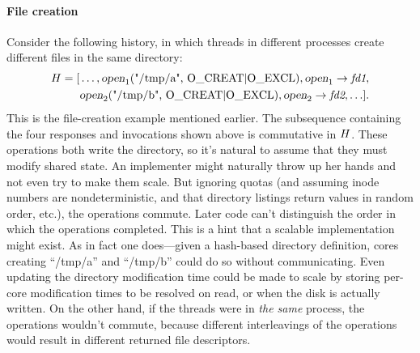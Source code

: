\begin{comment}
Careful analysis using our commutativity definition reveals that
increments and decrements commute as long as the counter is large
enough. If the counter is small, however, decrements may not commute.
For example, if the counter is one, and there are two concurrent
decrements, which one returns true and which false depends on
the order. Thus this interface does not allow a generally commutative
implementation.

However, the commutativity analysis suggests a way to change the
interface so that it can scale. In particular:
\begin{verbatim}
  inc() -> void
  dec() -> void
  nonzero?() -> boolean
\end{verbatim}
Now increments and decrements scale. If the calls to \OP{nonzero?}
can be moved to a background thread that occasionally collects
garbage, then the common case can be made to scale.

\XXX[rtm][this is a lot like the ispos example, but cast in a way
that I think makes it more clear why it's useful to the programmer to
have a precise definition of commutativity. also I think we should have
an example that involves a programming using commutativity to help
choose a better interface.]
\end{comment}


\paragraph{File creation}  Consider the following history, in which
threads in different processes create different files in the same directory:
%
\begin{align*}
\HIST{H} = [& \ldots, \INV{open}{\text{\code{"/tmp/a", O_CREAT|O_EXCL}}}{1},
    \RES{open}{\textit{fd1}}{1}, \\
  & \INV{open}{\text{\code{"/tmp/b", O_CREAT|O_EXCL}}}{2},
    \RES{open}{\textit{fd2}}{2}, \ldots ].
\end{align*}
%
This is the file-creation example mentioned earlier.
%
The subsequence containing the four responses and invocations shown
above is commutative in $H$.
%
These operations both write
the directory, so it's natural to assume that they must modify shared
state. An implementer might naturally throw up her hands and not even
try to make them scale. But ignoring quotas (and assuming inode
numbers are nondeterministic, and that directory listings return values
in random order, etc.), the operations commute. Later code
can't distinguish the order in which the operations completed. This is
a hint that a scalable implementation might exist. As in fact one
does---given a hash-based directory definition, cores creating
``/tmp/a'' and ``/tmp/b'' could do so without
communicating. Even updating the directory modification time could be
made to scale by storing per-core modification times to be resolved on
read, or when the disk is actually written.
%
On the other hand, if the threads were in \emph{the same} process, the
operations wouldn't commute, because different interleavings of the
operations would result in different returned file descriptors.


